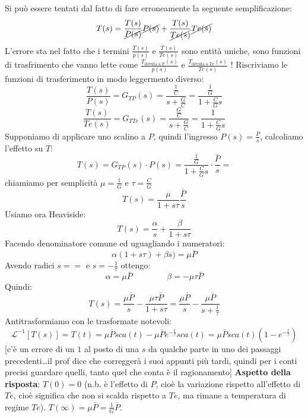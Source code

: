 Si può essere tentati dal fatto di fare erroneamente la seguente semplificazione:
\[
    T(s) = \frac{T(s)}{\cancel{P(s)}}\cancel{P(s)} + \frac{T(s)}{\cancel{Te(s)}}\cancel{Te(s)}
\]
L'errore sta nel fatto che i termini $\frac{T(s)}{p(s)}$ e $\frac{T(s)}{Te(s)}$ sono entità uniche, sono funzioni di trasfrimento che vanno lette come $\frac{T_{\text{dovuta a P}}(s)}{p(s)}$ e $\frac{T_{\text{dovuta a Te}}(s)}{Te(s)}$ !\newline
\newline
Riscriviamo le funzioni di trasferimento in modo leggermento diverso:
\[
    \frac{T(s)}{P(s)} = G_{TP}(s)= \frac{\frac{1}{C}}{s + \frac{G}{C}} = \frac{\frac{1}{G}}{1 + \frac{C}{G}s}
\]
\[
    \frac{T(s)}{Te(s)} = G_{TTe}(s) = \frac{\frac{G}{C}}{s+ \frac{G}{C}} = \frac{1}{1 + \frac{C}{G}s}
\]
Supponiamo di applicare uno scalino a $P$, quindi l'ingresso $P(s) = \frac{\bar{P}}{s}$, calcoliamo l'effetto su $T$:
\[
    T(s) = G_{TP}(s) \cdot P(s) = \frac{\frac{1}{G}}{1 + \frac{C}{G}s} \cdot  \frac{\bar{P}}{s} = 
\]
chiamiamo per semplicità $\mu = \frac{1}{G}$ e $\tau = \frac{C}{G}$ 
\[
    T(s) = \frac{\mu}{1 + s \tau} \frac{\bar{P}}{s}
\]
Usiamo ora Heaviside:
\[
    T(s) = \frac{\alpha}{s} + \frac{\beta}{1 + s \tau}
\]
Facendo denominatore comune ed uguagliando i numeratori:
\[
    \alpha(1 + s \tau) + \beta s ) = \mu \bar{P}
\]
Avendo radici $s= =$ e $ s= - \frac{1}{\tau}$ ottengo:
\[
    \alpha = \mu \bar{P} \;\;\;\;\;\;\;\;\;\;\;\;\;\;\;\beta=-\mu \tau \bar{P}
\]
Quindi:
\[
    T(s) = \frac{\mu \bar{P}}{s} - \frac{\mu \tau \bar{P}}{1 + s \tau} = \frac{\mu \bar{P}}{s} - \frac{\mu \bar{P}}{s + \frac{1}{\tau}}
\]
Antitrasformiamo con le trasformate notevoli:
\[
    \mathcal{L}^{-1}[T(s)] = T(t) = \mu \bar{P} sca(t) - \mu \bar{P} e^{-\frac{t}{\tau}} sca(t) = \mu \bar{P} sca(t) (1- e^{- \frac{t}{\tau}})
\]
[c'è un errore di un $1$ al posto di una $s$ da qualche parte in uno dei passaggi precedenti\dots il prof dice che correggerà i suoi appunti più tardi, quindi per i conti precisi guardare quelli, tanto quel che conta è il ragionamento]\newline
\newline
\textbf{Aspetto della risposta}:\newline
\newline
$T(0) = 0$ (n.b. è l'effetto di $P$, cioè la variazione rispetto all'effetto di $Te$, cioè significa che non si scalda rispetto a $Te$, ma rimane a temperatura di regime $Te$).\newline
\newline
$T(\infty) = \mu \bar{P} = \frac{1}{G}\bar{P}$.\newline
